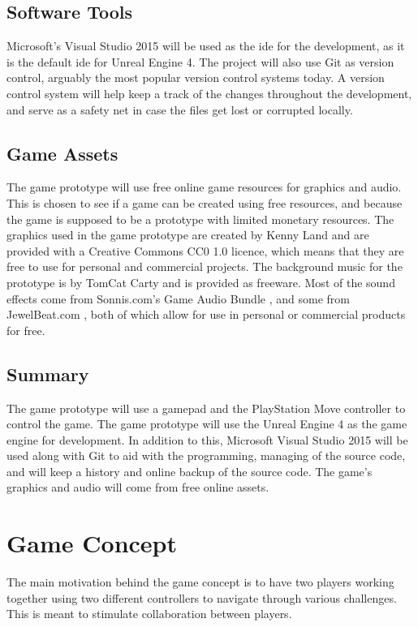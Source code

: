 \subsection{Software Tools}
Microsoft's Visual Studio 2015 will be used as the \gls{ide} for the development, as it is the default \gls{ide} for Unreal Engine 4. The project will also use Git as version control, arguably the most popular version control systems today. A version control system will help keep a track of the changes throughout the development, and serve as a safety net in case the files get lost or corrupted locally.

\subsection{Game Assets}
The game prototype will use free online game resources for graphics and audio. This is chosen to see if a game can be created using free resources, and because the game is supposed to be a prototype with limited monetary resources. The graphics used in the game prototype are created by Kenny Land \cite{kenney2016platformer} and are provided with a Creative Commons CC0 1.0 licence, which means that they are free to use for personal and commercial projects. The background music for the prototype is by TomCat Carty \cite{carty2015space} and is provided as freeware. Most of the sound effects come from Sonnis.com's Game Audio Bundle \cite{sonnis2016audio}, and some from JewelBeat.com \cite{jewelbeat2016audio}, both of which allow for use in personal or commercial products for free.

\subsection{Summary}
The game prototype will use a gamepad and the PlayStation Move controller to control the game. The game prototype will use the Unreal Engine 4 as the game engine for development. In addition to this, Microsoft Visual Studio 2015 will be used along with Git to aid with the programming, managing of the source code, and will keep a history and online backup of the source code. The game's graphics and audio will come from free online assets.


\section{Game Concept}
The main motivation behind the game concept is to have two players working together using two different controllers to navigate through various challenges. This is meant to stimulate collaboration between players.

